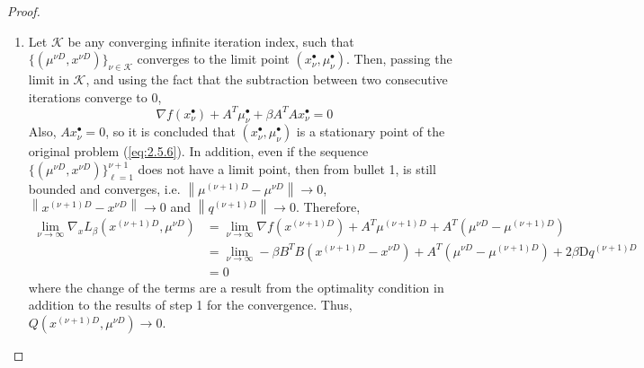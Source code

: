 \begin{proof}
\begin{enumerate}
            \item Let $\mathcal{K}$ be any converging infinite iteration index, such that $\{(\mu^{\nu D}, x^{\nu D})\}_{\nu \in \mathcal{K}}$ converges to the limit point $(x_{\nu}^{\bullet}, \mu_{\nu}^{\bullet})$. Then, passing the limit in $\mathcal{K}$, and using the fact that the subtraction between two consecutive iterations converge to 0,
            \begin{equation*}
                \nabla f(x_{\nu}^{\bullet}) + A^T\mu_{\nu}^{\bullet} + \beta A^TAx_{\nu}^{\bullet} = 0
            \end{equation*}
            Also, $Ax_{\nu}^{\bullet} = 0$, so it is concluded that $(x_{\nu}^{\bullet}, \mu_{\nu}^{\bullet})$ is a stationary point of the original problem (\ref{eq:2.5.6}). In addition, even if the sequence $\{(\mu^{\nu D}, x^{\nu D})\}_{\ell = 1}^{\nu + 1}$ does not have a limit point, then from bullet 1, is still bounded and converges, i.e. $\left \lVert \mu^{(\nu + 1)D} - \mu^{\nu D} \right \rVert \to 0$, $\left \lVert x^{(\nu + 1)D} - x^{\nu D} \right \rVert \to 0$ and $\left \lVert q^{(\nu + 1)D} \right \rVert \to 0$. Therefore,
            \begin{equation*}
                \begin{align}
                    \lim_{\nu \to \infty} \nabla_x L_{\beta}(x^{(\nu + 1)D}, \mu^{\nu D}) & = \lim_{\nu \to \infty} \nabla f(x^{(\nu + 1)D}) + A^T\mu^{(\nu + 1)D} + A^T(\mu^{\nu D} - \mu^{(\nu + 1)D})\\
                    & = \lim_{\nu \to \infty} -\beta B^TB(x^{(\nu + 1)D} - x^{\nu D}) + A^T(\mu^{\nu D} - \mu^{(\nu + 1)D}) + 2\beta\mathrm{D}q^{(\nu + 1)D}\\ 
                    & = 0
                \end{align}
            \end{equation*}
            where the change of the terms are a result from the optimality condition in addition to the results of step 1 for the convergence. Thus, $Q(x^{(\nu + 1)D}, \mu^{\nu D}) \to 0$.


\end{enumerate}
\end{proof}
